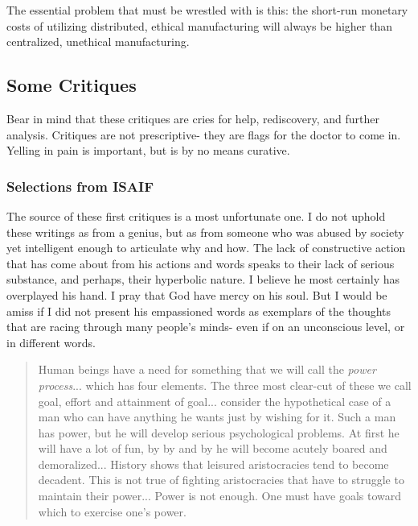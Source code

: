 \documentclass[letterpaper]{article}
\begin{document}
The essential problem that must be wrestled with is this: the short-run monetary costs of utilizing distributed, ethical manufacturing will always be higher than centralized, unethical manufacturing.



\iffalse

\subsection{Some Critiques}

Bear in mind that these critiques are cries for help, rediscovery, and further analysis. Critiques are not prescriptive- they are flags for the doctor to come in. Yelling in pain is important, but is by no means curative.



\subsubsection{Selections from ISAIF}

The source of these first critiques is a most unfortunate one. I do not uphold these writings as from a genius, but as from someone who was abused by society yet intelligent enough to articulate why and how. The lack of constructive action that has come about from his actions and words speaks to their lack of serious substance, and perhaps, their hyperbolic nature. I believe he most certainly has overplayed his hand. I pray that God have mercy on his soul. But I would be amiss if I did not present his empassioned words as exemplars of the thoughts that are racing through many people's minds- even if on an unconscious level, or in different words.

\begin{quote}
Human beings have a need for something that we will call the \textit{power process}... which has four elements. The three most clear-cut of these we call goal, effort and attainment of goal... consider the hypothetical case of a man who can have anything he wants just by wishing for it. Such a man has power, but he will develop serious psychological problems. At first he will have a lot of fun, by by and by he will become acutely boared and demoralized... History shows that leisured aristocracies tend to become decadent. This is not true of fighting aristocracies that have to struggle to maintain their power... Power is not enough. One must have goals toward which to exercise one's power.
\end{quote}
\end{document}
